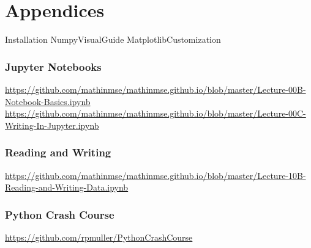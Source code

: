 %
%	       
%	       
%
\part{Appendices} %

	
{Installation}
{NumpyVisualGuide}
{MatplotlibCustomization} %

\section{Jupyter Notebooks}
\url{https://github.com/mathinmse/mathinmse.github.io/blob/master/Lecture-00B-Notebook-Basics.ipynb}
\url{https://github.com/mathinmse/mathinmse.github.io/blob/master/Lecture-00C-Writing-In-Jupyter.ipynb}

\section{Reading and Writing}
\url{https://github.com/mathinmse/mathinmse.github.io/blob/master/Lecture-10B-Reading-and-Writing-Data.ipynb}

\section{Python Crash Course}
\url{https://github.com/rpmuller/PythonCrashCourse}
